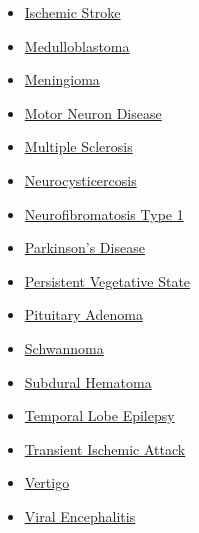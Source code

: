 \begin{itemize}[noitemsep]
  \item \hyperlink{sec:Ischemic Stroke}{Ischemic Stroke}
  \item \hyperlink{sec:Medulloblastoma}{Medulloblastoma}
  \item \hyperlink{sec:Meningioma}{Meningioma}
  \item \hyperlink{sec:Motor Neuron Disease}{Motor Neuron Disease}
  \item \hyperlink{sec:Multiple Sclerosis}{Multiple Sclerosis}
  \item \hyperlink{sec:Neurocysticercosis}{Neurocysticercosis}
  \item \hyperlink{sec:Neurofibromatosis Type 1}{Neurofibromatosis Type 1}
  \item \hyperlink{sec:Parkinson's Disease}{Parkinson's Disease}
  \item \hyperlink{sec:Persistent Vegetative State}{Persistent Vegetative State}
  \item \hyperlink{sec:Pituitary Adenoma}{Pituitary Adenoma}
  \item \hyperlink{sec:Schwannoma}{Schwannoma}
  \item \hyperlink{sec:Subdural Hematoma}{Subdural Hematoma}
  \item \hyperlink{sec:Temporal Lobe Epilepsy}{Temporal Lobe Epilepsy}
  \item \hyperlink{sec:Transient Ischemic Attack}{Transient Ischemic Attack}
  \item \hyperlink{sec:Vertigo}{Vertigo}
  \item \hyperlink{sec:Viral Encephalitis}{Viral Encephalitis}
\end{itemize}

